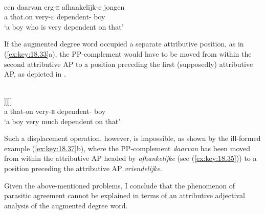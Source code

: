 \documentclass[output=paper]{langsci/langscibook}
\begin{document}
\ea%
    \label{ex:key:18.35}\\
    \gll  een    daarvan  erg-\textsc{e}    afhankelijk-e    jongen\\
         a        that.on      very-\textsc{e}  dependent-\Agr{}    boy\\
    \glt \enquote*{a boy who is very dependent on that}
\z

If the augmented degree word occupied a separate attributive position, as in
(\ref{ex:key:18.33}a), the PP-complement would have to be moved from within the
second attributive AP to a position preceding the first (supposedly)
attributive AP, as depicted in .

\ea%
    \label{ex:key:18.36}\\
    \gll  [\textsubscript{DP}  een    [daarvan\textsubscript{i}  [\textsubscript{NP}  erg\textbf{\textsc{-e}}  [\textsubscript{NP}  [t\textsubscript{i}    afhankelijk\textbf{e}]  [\textsubscript{NP}  jongen]]]]]\\
      {}  a              that-on   {}         very-\textsc{e}      {}  {}    dependent-\Agr{}   {}   boy\\
    \glt \enquote*{a boy very much dependent on that}
\z

Such a displacement operation, however, is impossible, as shown by the
ill-formed example (\ref{ex:key:18.37}b), where the PP-complement \emph{daarvan} has
been moved from within the attributive AP headed by \emph{afhankelijke} (see
(\ref{ex:key:18.35})) to a position preceding the attributive AP
\emph{vriendelijke}.

\ea%
    \label{ex:key:18.37}
	\z
\z

Given the above-mentioned problems, I conclude that the phenomenon of parasitic
agreement cannot be explained in terms of an attributive adjectival analysis of
the augmented degree word.
\end{document}
